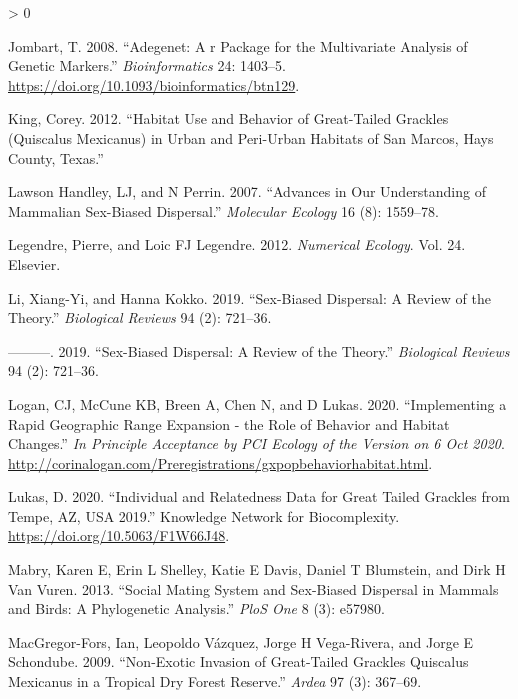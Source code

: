 \documentclass[
]{article}
\newlength{\cslhangindent}
\newenvironment{CSLReferences}[2] %
 {%
  \setlength{\parindent}{0pt}
  \ifodd #1 \everypar{\setlength{\hangindent}{\cslhangindent}}\ignorespaces\fi
  \ifnum #2 > 0
  \setlength{\parskip}{#2\baselineskip}
  \fi
 }%
 {}
\begin{document}
\begin{CSLReferences}{1}{0}
\leavevmode\hypertarget{ref-Jombart2008adegenet}{}%
Jombart, T. 2008. {``Adegenet: A r Package for the Multivariate Analysis
of Genetic Markers.''} \emph{Bioinformatics} 24: 1403--5.
\url{https://doi.org/10.1093/bioinformatics/btn129}.

\leavevmode\hypertarget{ref-king2012habitat}{}%
King, Corey. 2012. {``Habitat Use and Behavior of Great-Tailed Grackles
(Quiscalus Mexicanus) in Urban and Peri-Urban Habitats of San Marcos,
Hays County, Texas.''}

\leavevmode\hypertarget{ref-lawson2007advances}{}%
Lawson Handley, LJ, and N Perrin. 2007. {``Advances in Our Understanding
of Mammalian Sex-Biased Dispersal.''} \emph{Molecular Ecology} 16 (8):
1559--78.

\leavevmode\hypertarget{ref-legendre2012numerical}{}%
Legendre, Pierre, and Loic FJ Legendre. 2012. \emph{Numerical Ecology}.
Vol. 24. Elsevier.

\leavevmode\hypertarget{ref-li2019sex}{}%
Li, Xiang-Yi, and Hanna Kokko. 2019. {``Sex-Biased Dispersal: A Review
of the Theory.''} \emph{Biological Reviews} 94 (2): 721--36.

\leavevmode\hypertarget{ref-li2019sex}{}%
---------. 2019. {``Sex-Biased Dispersal: A Review of the Theory.''}
\emph{Biological Reviews} 94 (2): 721--36.

\leavevmode\hypertarget{ref-logan2020xpop}{}%
Logan, CJ, McCune KB, Breen A, Chen N, and D Lukas. 2020.
{``Implementing a Rapid Geographic Range Expansion - the Role of
Behavior and Habitat Changes.''} \emph{In Principle Acceptance by PCI
Ecology of the Version on 6 Oct 2020}.
\url{http://corinalogan.com/Preregistrations/gxpopbehaviorhabitat.html}.

\leavevmode\hypertarget{ref-lukas2020geneticdata}{}%
Lukas, D. 2020. {``Individual and Relatedness Data for Great Tailed
Grackles from Tempe, AZ, USA 2019.''} Knowledge Network for
Biocomplexity. \url{https://doi.org/10.5063/F1W66J48}.

\leavevmode\hypertarget{ref-mabry2013social}{}%
Mabry, Karen E, Erin L Shelley, Katie E Davis, Daniel T Blumstein, and
Dirk H Van Vuren. 2013. {``Social Mating System and Sex-Biased Dispersal
in Mammals and Birds: A Phylogenetic Analysis.''} \emph{PloS One} 8 (3):
e57980.

\leavevmode\hypertarget{ref-macgregor2009non}{}%
MacGregor-Fors, Ian, Leopoldo Vázquez, Jorge H Vega-Rivera, and Jorge E
Schondube. 2009. {``Non-Exotic Invasion of Great-Tailed Grackles
Quiscalus Mexicanus in a Tropical Dry Forest Reserve.''} \emph{Ardea} 97
(3): 367--69.


\end{CSLReferences}
\end{document}
